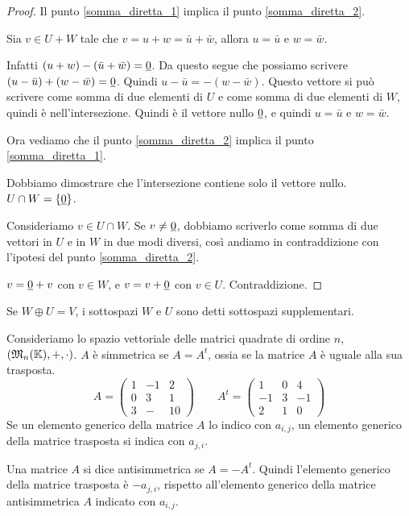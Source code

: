 \begin{proof}
Il punto \ref{somma_diretta_1} implica il punto \ref{somma_diretta_2}.

Sia $v \in U + W$ tale che $v = u + w = \bar{u} + \bar{w}$, allora $u = \bar{u}$ e $w = \bar{w}$.

Infatti $(u + w) - (\bar{u} + \bar{w}) = \underline{0}$. Da questo segue che possiamo scrivere $(u - \bar{u}) + (w - \bar{w}) = \underline{0}$. Quindi $u - \bar{u} = - (w - \bar{w})$. Questo vettore si pu\`o scrivere come somma di due elementi di $U$ e come somma di due elementi di $W$, quindi \`e nell'intersezione. Quindi \`e il vettore nullo $\underline{0}$, e quindi $u = \bar{u}$ e $w = \bar{w}$.

Ora vediamo che il punto \ref{somma_diretta_2} implica il punto \ref{somma_diretta_1}.

Dobbiamo dimostrare che l'intersezione contiene solo il vettore nullo. $U \cap W = \{ \underline{0} \}$.

Consideriamo $v \in U \cap W$. Se $v \neq \underline{0}$, dobbiamo scriverlo come somma di due vettori in $U$ e in $W$ in due modi diversi, cos\`i andiamo in contraddizione con l'ipotesi del punto \ref{somma_diretta_2}.

$v = \underline{0} + v$ con $v \in W$, e $v = v + \underline{0}$ con $v \in U$. Contraddizione.
\end{proof}

Se $W \oplus U = V$, i sottospazi $W$ e $U$ sono detti sottospazi supplementari.

Consideriamo lo spazio vettoriale delle matrici quadrate di ordine $n$, $(\mathfrak{M}_n (\mathbb{K}), +, \cdot)$. $A$ \`e simmetrica se $A = A^t$, ossia se la matrice $A$ \`e uguale alla sua trasposta.
\[
A =
\begin{pmatrix}
1 & -1 & 2 \\
0 & 3 & 1 \\
3 & - & 10
\end{pmatrix}
\qquad
A^t =
\begin{pmatrix}
1 & 0 & 4 \\
-1 & 3 & -1 \\
2 & 1 & 0
\end{pmatrix}
\]
Se un elemento generico della matrice $A$ lo indico con $a_{i,j}$, un elemento generico della matrice trasposta si indica con $a_{j,i}$.

Una matrice $A$ si dice antisimmetrica se $A = -A^t$. Quindi l'elemento generico della matrice trasposta \`e $-a_{j,i}$, rispetto all'elemento generico della matrice antisimmetrica $A$ indicato con $a_{i,j}$.


